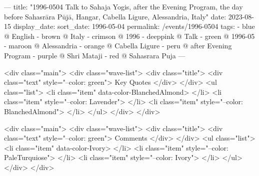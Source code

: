 ---
title: "1996-0504 Talk to Sahaja Yogis, after the Evening Program, the day before Sahasrāra Pūjā, Hangar, Cabella Ligure, Alessandria, Italy"
date: 2023-08-15
display_date: 
sort_date: 1996-05-04
permalink: /events/1996-0504
tags:
  - blue @ English
  - brown @ Italy
  - crimson @ 1996
  - deeppink @ Talk
  - green @ 1996-05
  - maroon @ Alessandria
  - orange @ Cabella Ligure
  - peru @ after Evening Program
  - purple @ Shri Mataji
  - red @ Sahasrara Puja
---

<div class="main">
  <div class="wave-list">
    <div class="title">
      <div class="text" style="--color: green">
        Key Quotes
      </div>
    </div>
    <ul class="list">
        <li class="item" data-color-BlanchedAlmond>
        </li>
        <li class="item" style="--color: Lavender">
        </li>
        <li class="item" style="--color: BlanchedAlmond">
        </li>
      </ul>
  </div>
</div>

<div class="main">
  <div class="wave-list">
    <div class="title">
      <div class="text" style="--color: green">
        Comments
      </div>
    </div>
    <ul class="list">
        <li class="item" data-color-Ivory>
        </li>
        <li class="item" style="--color: PaleTurquiose">
        </li>
        <li class="item" style="--color: Ivory">
        </li>
      </ul>
  </div>
</div>
